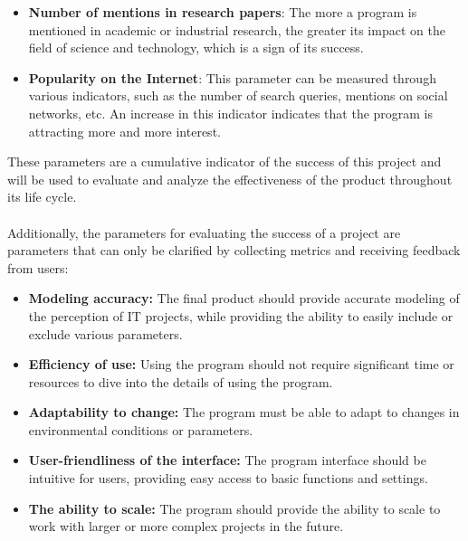\documentclass{article}
\begin{document}
    \begin{minipage}{0.49\textwidth}
        \begin{itemize}
            \item \textbf{Number of mentions in research papers}: The more a program is mentioned in academic or industrial research, the greater its impact on the field of science and technology, which is a sign of its success.
            \item \textbf{Popularity on the Internet}: This parameter can be measured through various indicators, such as the number of search queries, mentions on social networks, etc. An increase in this indicator indicates that the program is attracting more and more interest.
        \end{itemize}
        These parameters are a cumulative indicator of the success of this project and will be used to evaluate and analyze the effectiveness of the product throughout its life cycle.\\
        ~\\
        Additionally, the parameters for evaluating the success of a project are parameters that can only be clarified by collecting metrics and receiving feedback from users:
        \begin{itemize}
            \item \textbf{Modeling accuracy:} The final product should provide accurate modeling of the perception of IT projects, while providing the ability to easily include or exclude various parameters.
            \item \textbf{Efficiency of use:} Using the program should not require significant time or resources to dive into the details of using the program.
            \item \textbf{Adaptability to change:} The program must be able to adapt to changes in environmental conditions or parameters.
            \item \textbf{User-friendliness of the interface:} The program interface should be intuitive for users, providing easy access to basic functions and settings.
            \item \textbf{The ability to scale:} The program should provide the ability to scale to work with larger or more complex projects in the future.
        \end{itemize}
        \begin{center}

\end{center}
\end{minipage}
\end{document}
